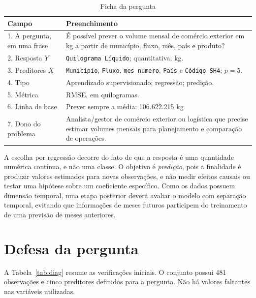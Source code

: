 \documentclass[
  article,12pt,oneside,a4paper,english,brazil
]{abntex2}
\begin{document}
\begin{table}[htb]
  \centering
  \caption{Ficha da pergunta}
  \label{tab:ficha}
  \small
  \begin{tabular}{@{}p{}p{}@{}}
    \toprule
    \textbf{Campo} & \textbf{Preenchimento} \\
    \midrule
    1. A pergunta, em uma frase &
    É possível prever o volume mensal de comércio exterior em kg a partir de
    município, fluxo, mês, país e produto? \\
    2. Resposta $Y$ &
    \texttt{Quilograma Líquido}; quantitativa; kg. \\
    3. Preditores $X$ &
    \texttt{Município}, \texttt{Fluxo}, \texttt{mes\_numero},
    \texttt{País} e \texttt{Código SH4}; $p=5$. \\
    4. Tipo &
    Aprendizado supervisionado; regressão; predição. \\
    5. Métrica &
    RMSE, em quilogramas. \\
    6. Linha de base &
    Prever sempre a média: 106.622.215 kg \\
    7. Dono do problema &
    Analista/gestor de comércio exterior ou logística que precise estimar
    volumes mensais para planejamento e comparação de operações. \\
    \bottomrule
  \end{tabular}
\end{table}

A escolha por regressão decorre do fato de que a resposta é uma quantidade
numérica contínua, e não uma classe. O objetivo é \emph{predição}, pois a
finalidade é produzir valores estimados para novas observações, e não medir
efeitos causais ou testar uma hipótese sobre um coeficiente específico.
Como os dados possuem dimensão temporal, uma etapa posterior deverá avaliar o
modelo com separação temporal, evitando que informações de meses futuros
participem do treinamento de uma previsão de meses anteriores.

\section{Defesa da pergunta}

A Tabela~\ref{tab:diag} resume as verificações iniciais. O conjunto possui
481 observações e cinco preditores definidos para a pergunta. Não há
valores faltantes nas variáveis utilizadas.
\end{document}
